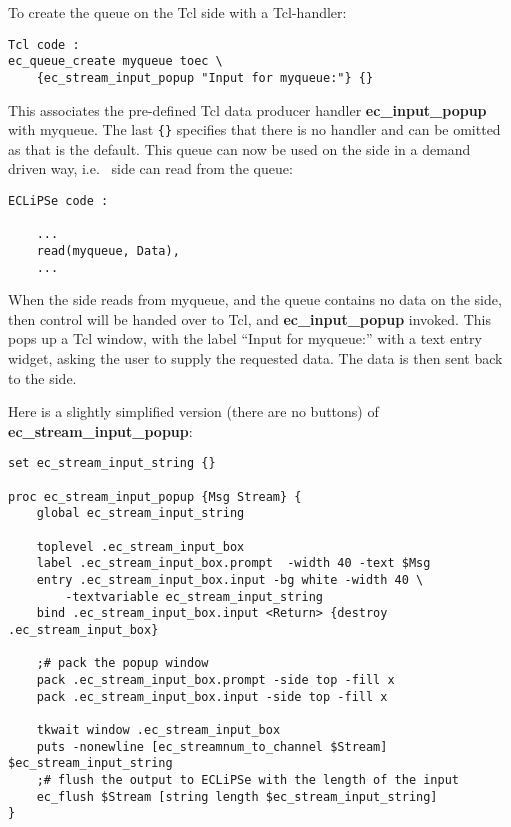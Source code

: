 To create the queue on the Tcl side with a Tcl-handler:

\begin{verbatim}
Tcl code :  
ec_queue_create myqueue toec \
    {ec_stream_input_popup "Input for myqueue:"} {}
\end{verbatim}

This associates the pre-defined Tcl data producer handler {\bf
ec_input_popup} with myqueue. The last \verb'{}' specifies that there is no
{\eclipse} handler and can be omitted as that is the default. This queue
can now be used on the {\eclipse} side in a demand driven way, i.e.\
{\eclipse} side can read from the queue:

\begin{verbatim}
ECLiPSe code :

    ...
    read(myqueue, Data),
    ...
\end{verbatim}

When the {\eclipse} side reads from myqueue, and the queue contains no data
on the {\eclipse} side, then
control will be handed over to Tcl, and {\bf ec_input_popup} 
invoked. This pops up a Tcl window, with the label ``Input for myqueue:''
with a text entry widget, asking the user to supply the requested data. The
data is then sent back to the {\eclipse} side.

Here is a slightly simplified version (there are no buttons)
of {\bf ec_stream_input_popup}:

\begin{verbatim}
set ec_stream_input_string {}

proc ec_stream_input_popup {Msg Stream} {
    global ec_stream_input_string

    toplevel .ec_stream_input_box
    label .ec_stream_input_box.prompt  -width 40 -text $Msg
    entry .ec_stream_input_box.input -bg white -width 40 \
        -textvariable ec_stream_input_string
    bind .ec_stream_input_box.input <Return> {destroy .ec_stream_input_box}

    ;# pack the popup window
    pack .ec_stream_input_box.prompt -side top -fill x
    pack .ec_stream_input_box.input -side top -fill x

    tkwait window .ec_stream_input_box
    puts -nonewline [ec_streamnum_to_channel $Stream] $ec_stream_input_string
    ;# flush the output to ECLiPSe with the length of the input
    ec_flush $Stream [string length $ec_stream_input_string]
}

\end{verbatim}

